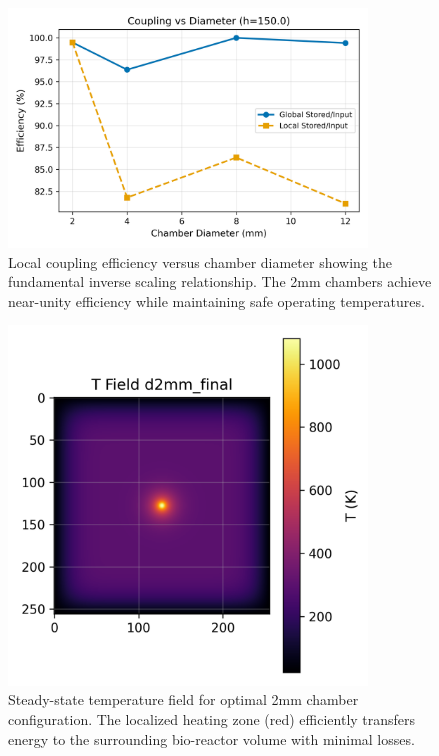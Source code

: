 \begin{figure}[H]
    \centering
    \includegraphics[width=0.85\textwidth]{figures/simulations/coupling_vs_diameter_h150.0_DEV_CYCLE_4.png}
    \caption{Local coupling efficiency versus chamber diameter showing the fundamental inverse scaling relationship. The 2mm chambers achieve near-unity efficiency while maintaining safe operating temperatures.}
    \label{fig:coupling_vs_diameter}
\end{figure}

\begin{figure}[H]
    \centering
    \includegraphics[width=0.85\textwidth]{figures/simulations/field_d2mm_final_DEV_CYCLE_4.png}
    \caption{Steady-state temperature field for optimal 2mm chamber configuration. The localized heating zone (red) efficiently transfers energy to the surrounding bio-reactor volume with minimal losses.}
    \label{fig:field_final}
\end{figure}

